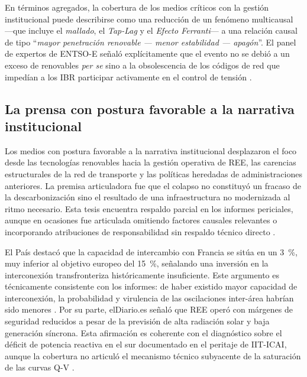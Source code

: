 En términos agregados, la cobertura de los medios críticos con la
gestión institucional puede describirse como una reducción de un
fenómeno multicausal ---que incluye el \textit{mallado}, el
\textit{Tap-Lag} y el \textit{Efecto Ferranti}--- a una relación
causal de tipo ``\textit{mayor penetración renovable --- menor estabilidad
--- apagón}''. El panel de expertos de ENTSO-E señaló explícitamente
que el evento no se debió a un exceso de renovables \textit{per se} sino a la
obsolescencia de los códigos de red que impedían a los IBR participar
activamente en el control de tensión \cite{entsoe2025}.

\subsection*{La prensa con postura favorable a la narrativa institucional}

Los medios con postura favorable a la narrativa institucional
desplazaron el foco desde las tecnologías renovables hacia la gestión
operativa de REE, las carencias estructurales de la red de transporte
y las políticas heredadas de administraciones anteriores. La premisa
articuladora fue que el colapso no constituyó un fracaso de la
descarbonización sino el resultado de una infraestructura no
modernizada al ritmo necesario. Esta tesis encuentra respaldo parcial
en los informes periciales, aunque en ocasiones fue articulada
omitiendo factores causales relevantes o incorporando atribuciones de
responsabilidad sin respaldo técnico directo \cite{gobierno2025}.

El País destacó que la capacidad de intercambio con Francia se
sitúa en un 3~\%, muy inferior al objetivo europeo del 15~\%,
señalando una inversión  en la interconexión transfronteriza históricamente insuficiente. Este
argumento es técnicamente consistente con los informes: de haber
existido mayor capacidad de interconexión, la probabilidad y
virulencia de las oscilaciones inter-área habrían sido menores
\cite{entsoe2025}. Por su parte, elDiario.es señaló que REE operó
con márgenes de seguridad reducidos a pesar de la previsión de alta
radiación solar y baja generación síncrona. Esta afirmación es
coherente con el diagnóstico sobre el déficit de potencia reactiva en
el sur documentado en el peritaje de IIT-ICAI, aunque la cobertura
no articuló el mecanismo técnico subyacente de la saturación de las
curvas Q-V \cite{icai2025}.

